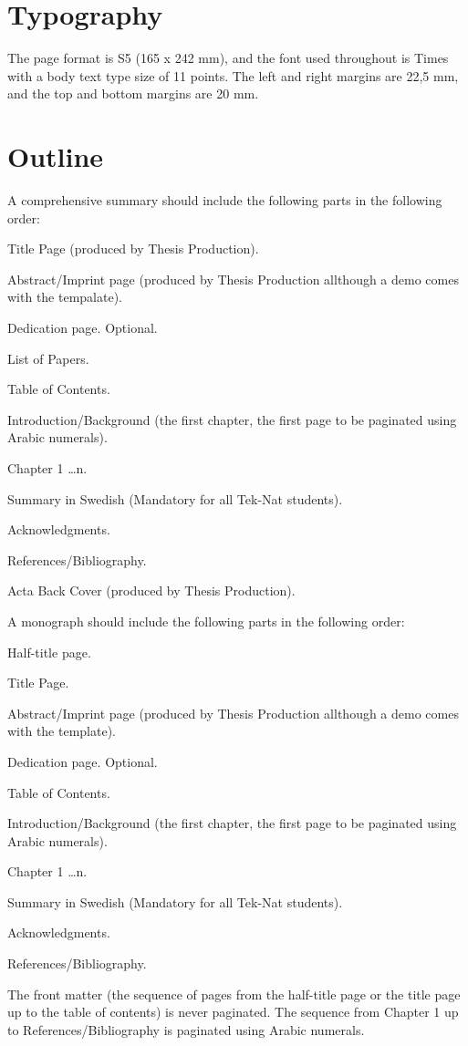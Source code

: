 \section{Typography}

The page format is S5 (165 x 242 mm), and the font used throughout is Times with a body text type size of 11 points. The left and right margins are 22,5 mm, and the top and bottom margins are 20 mm.
\section{Outline}
A comprehensive summary should include the following parts in the following order:
\begin{bulletlist}
    \item Title Page (produced by Thesis Production).
    \item Abstract/Imprint page (produced by Thesis Production all\-though a demo comes with the tempalate).
    \item Dedication page. Optional.
    \item List of Papers.
    \item Table of Contents.
    \item Introduction/Background (the first chapter, the first page to be paginated using Arabic numerals).
    \item Chapter 1 \ldots n.
    \item Summary in Swedish (Mandatory for all Tek-Nat students).
    \item Acknowledgments.
    \item References/Bibliography.
    \item Acta Back Cover (produced by Thesis Production).
\end{bulletlist}
\vspace{1\baselineskip}
A monograph should include the following parts in the following order:

\begin{bulletlist}
    \item Half-title page.
    \item Title Page.
    \item Abstract/Imprint page (produced by Thesis Production all\-though a demo comes with the template).
    \item Dedication page. Optional.
    \item Table of Contents.
    \item Introduction/Background (the first chapter, the first page to be paginated using Arabic numerals).
    \item Chapter 1 \ldots n.
    \item Summary in Swedish (Mandatory for all Tek-Nat students).
    \item Acknowledgments.
    \item References/Bibliography.
\end{bulletlist}
\vspace{1\baselineskip}
\noindent The front matter (the sequence of pages from the half-title page or the title page up to the table of contents) is never paginated. The sequence from Chapter 1 up to References/Bibliography is paginated using Arabic numerals. 
